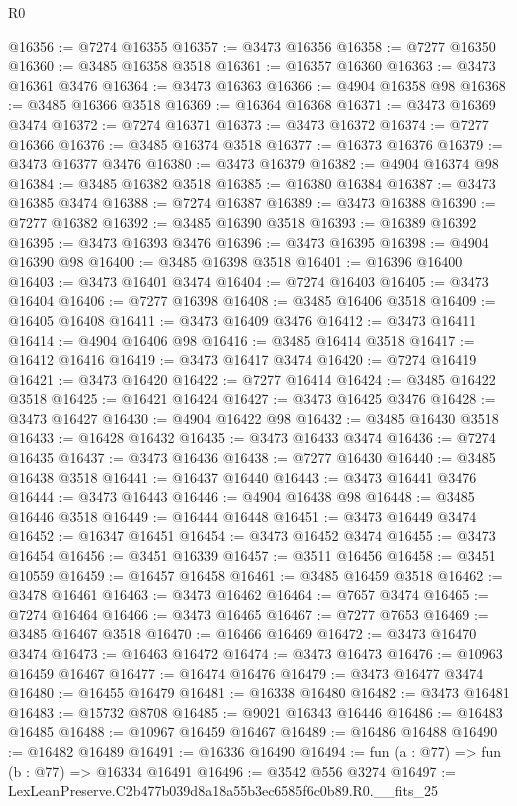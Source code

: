\begin{lexlean}{R0}
\begin{coremodule}
@16356 := @7274 @16355
@16357 := @3473 @16356
@16358 := @7277 @16350
@16360 := @3485 @16358 @3518
@16361 := @16357 @16360
@16363 := @3473 @16361 @3476
@16364 := @3473 @16363
@16366 := @4904 @16358 @98
@16368 := @3485 @16366 @3518
@16369 := @16364 @16368
@16371 := @3473 @16369 @3474
@16372 := @7274 @16371
@16373 := @3473 @16372
@16374 := @7277 @16366
@16376 := @3485 @16374 @3518
@16377 := @16373 @16376
@16379 := @3473 @16377 @3476
@16380 := @3473 @16379
@16382 := @4904 @16374 @98
@16384 := @3485 @16382 @3518
@16385 := @16380 @16384
@16387 := @3473 @16385 @3474
@16388 := @7274 @16387
@16389 := @3473 @16388
@16390 := @7277 @16382
@16392 := @3485 @16390 @3518
@16393 := @16389 @16392
@16395 := @3473 @16393 @3476
@16396 := @3473 @16395
@16398 := @4904 @16390 @98
@16400 := @3485 @16398 @3518
@16401 := @16396 @16400
@16403 := @3473 @16401 @3474
@16404 := @7274 @16403
@16405 := @3473 @16404
@16406 := @7277 @16398
@16408 := @3485 @16406 @3518
@16409 := @16405 @16408
@16411 := @3473 @16409 @3476
@16412 := @3473 @16411
@16414 := @4904 @16406 @98
@16416 := @3485 @16414 @3518
@16417 := @16412 @16416
@16419 := @3473 @16417 @3474
@16420 := @7274 @16419
@16421 := @3473 @16420
@16422 := @7277 @16414
@16424 := @3485 @16422 @3518
@16425 := @16421 @16424
@16427 := @3473 @16425 @3476
@16428 := @3473 @16427
@16430 := @4904 @16422 @98
@16432 := @3485 @16430 @3518
@16433 := @16428 @16432
@16435 := @3473 @16433 @3474
@16436 := @7274 @16435
@16437 := @3473 @16436
@16438 := @7277 @16430
@16440 := @3485 @16438 @3518
@16441 := @16437 @16440
@16443 := @3473 @16441 @3476
@16444 := @3473 @16443
@16446 := @4904 @16438 @98
@16448 := @3485 @16446 @3518
@16449 := @16444 @16448
@16451 := @3473 @16449 @3474
@16452 := @16347 @16451
@16454 := @3473 @16452 @3474
@16455 := @3473 @16454
@16456 := @3451 @16339
@16457 := @3511 @16456
@16458 := @3451 @10559
@16459 := @16457 @16458
@16461 := @3485 @16459 @3518
@16462 := @3478 @16461
@16463 := @3473 @16462
@16464 := @7657 @3474
@16465 := @7274 @16464
@16466 := @3473 @16465
@16467 := @7277 @7653
@16469 := @3485 @16467 @3518
@16470 := @16466 @16469
@16472 := @3473 @16470 @3474
@16473 := @16463 @16472
@16474 := @3473 @16473
@16476 := @10963 @16459 @16467
@16477 := @16474 @16476
@16479 := @3473 @16477 @3474
@16480 := @16455 @16479
@16481 := @16338 @16480
@16482 := @3473 @16481
@16483 := @15732 @8708
@16485 := @9021 @16343 @16446
@16486 := @16483 @16485
@16488 := @10967 @16459 @16467
@16489 := @16486 @16488
@16490 := @16482 @16489
@16491 := @16336 @16490
@16494 := fun (a : @77) => fun (b : @77) => @16334 @16491
@16496 := @3542 @556 @3274
@16497 := LexLeanPreserve.C2b477b039d8a18a55b3ec6585f6c0b89.R0.__fits_25

\end{coremodule}
\end{lexlean}
